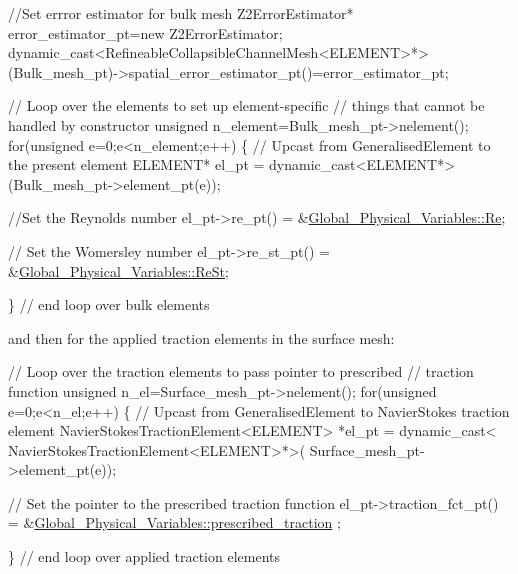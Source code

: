 \begin{DoxyCodeInclude}
   
 \textcolor{comment}{//Set errror estimator  for bulk mesh}
 Z2ErrorEstimator* error\_estimator\_pt=\textcolor{keyword}{new} Z2ErrorEstimator;
 \textcolor{keyword}{dynamic\_cast<}RefineableCollapsibleChannelMesh<ELEMENT>*\textcolor{keyword}{>}
  (Bulk\_mesh\_pt)->spatial\_error\_estimator\_pt()=error\_estimator\_pt;
 
 
 \textcolor{comment}{// Loop over the elements to set up element-specific }
 \textcolor{comment}{// things that cannot be handled by constructor}
 \textcolor{keywordtype}{unsigned} n\_element=Bulk\_mesh\_pt->nelement();
 \textcolor{keywordflow}{for}(\textcolor{keywordtype}{unsigned} e=0;e<n\_element;e++)
  \{
   \textcolor{comment}{// Upcast from GeneralisedElement to the present element}
   ELEMENT* el\_pt = \textcolor{keyword}{dynamic\_cast<}ELEMENT*\textcolor{keyword}{>}(Bulk\_mesh\_pt->element\_pt(e));
   
   \textcolor{comment}{//Set the Reynolds number}
   el\_pt->re\_pt() = &\hyperlink{namespaceGlobal__Physical__Variables_ab814e627d2eb5bc50318879d19ab16b9}{Global\_Physical\_Variables::Re};

   \textcolor{comment}{// Set the Womersley number}
   el\_pt->re\_st\_pt() = &\hyperlink{namespaceGlobal__Physical__Variables_a085ee4bf968ffdd01a41b8c41864f907}{Global\_Physical\_Variables::ReSt};
   
  \} \textcolor{comment}{// end loop over bulk elements}

\end{DoxyCodeInclude}


and then for the applied traction elements in the surface mesh\+:


\begin{DoxyCodeInclude}



  \textcolor{comment}{// Loop over the traction elements to pass pointer to prescribed }
  \textcolor{comment}{// traction function }
  \textcolor{keywordtype}{unsigned} n\_el=Surface\_mesh\_pt->nelement();
  \textcolor{keywordflow}{for}(\textcolor{keywordtype}{unsigned} e=0;e<n\_el;e++)
   \{
    \textcolor{comment}{// Upcast from GeneralisedElement to NavierStokes traction element}
    NavierStokesTractionElement<ELEMENT> *el\_pt = 
     \textcolor{keyword}{dynamic\_cast<} NavierStokesTractionElement<ELEMENT>*\textcolor{keyword}{>}(
      Surface\_mesh\_pt->element\_pt(e));
    
    \textcolor{comment}{// Set the pointer to the prescribed traction function}
    el\_pt->traction\_fct\_pt() = &\hyperlink{namespaceGlobal__Physical__Variables_a0de42ee6d39e85c77c16a04c3a05f7a2}{Global\_Physical\_Variables::prescribed\_traction}
      ;

   \}  \textcolor{comment}{// end loop over applied traction elements}

\end{DoxyCodeInclude}


